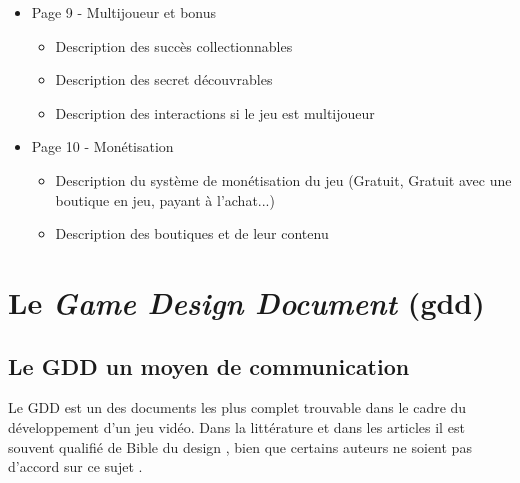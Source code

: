 \begin{itemize}
\begin{itemize}
    \end{itemize}
    \item Page 9 - Multijoueur et bonus
    \begin{itemize}
        \item Description des succès collectionnables
        \item Description des secret découvrables
        \item Description des interactions si le jeu est multijoueur
    \end{itemize}
    \item Page 10 - Monétisation
    \begin{itemize}
        \item Description du système de monétisation du jeu (Gratuit, Gratuit avec une boutique en jeu, payant à l'achat...)
        \item Description des boutiques et de leur contenu
    \end{itemize}
\end{itemize}




\section{Le \emph{Game Design Document} (\gls{gdd})}





\subsection{Le GDD un moyen de communication}
Le GDD est un des documents les plus complet trouvable dans le cadre du développement d'un jeu vidéo. Dans la littérature et dans les articles il est souvent qualifié de \guillemotleft Bible du design \guillemotright \cite{GD_foundations_pedersen}, bien que certains auteurs ne soient pas d'accord sur ce sujet \cite{LevelUpRogers2014}. 

